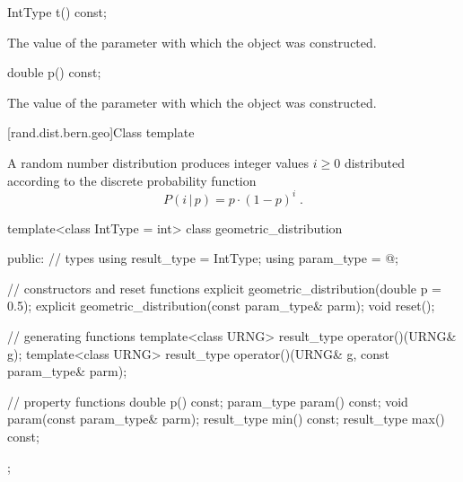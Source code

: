 %
%
\begin{itemdecl}
IntType t() const;
\end{itemdecl}%
\begin{itemdescr}
\pnum\returns The value of the  parameter
 with which the object was constructed.
\end{itemdescr}

%
%
\begin{itemdecl}
double p() const;
\end{itemdecl}

\begin{itemdescr}
\pnum\returns The value of the  parameter
 with which the object was constructed.
\end{itemdescr}


[rand.dist.bern.geo]{Class template }

\pnum
A  random number distribution
produces integer values $i \geq 0$
distributed according to
the discrete probability function
%
\[%
 P(i\,|\,p)
      = p \cdot (1-p)^{i}
\; \mbox{.}
\]

\begin{codeblock}
template<class IntType = int>
 class geometric_distribution
{
public:
 // types
 using result_type = IntType;
 using param_type  = @\unspec@;

 // constructors and reset functions
 explicit geometric_distribution(double p = 0.5);
 explicit geometric_distribution(const param_type& parm);
 void reset();

 // generating functions
 template<class URNG>
   result_type operator()(URNG& g);
 template<class URNG>
   result_type operator()(URNG& g, const param_type& parm);

 // property functions
 double p() const;
 param_type param() const;
 void param(const param_type& parm);
 result_type min() const;
 result_type max() const;
 };
\end{codeblock}


